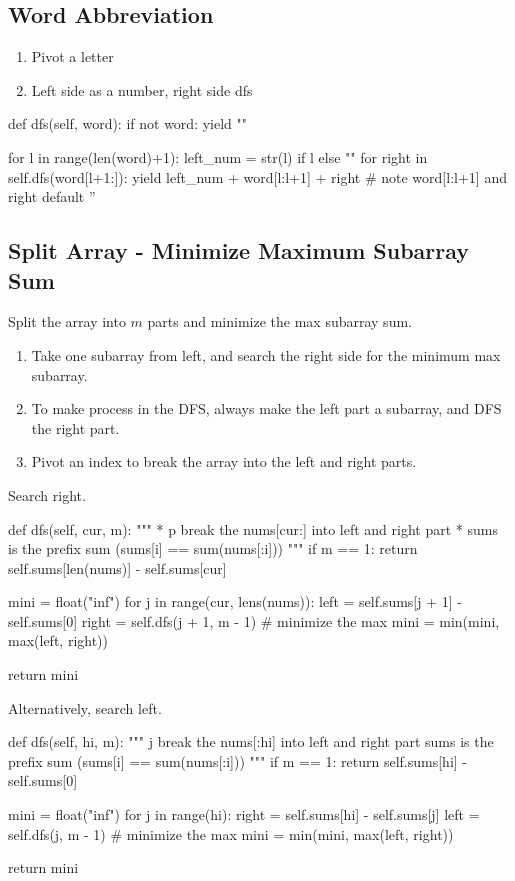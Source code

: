 \subsection{Word Abbreviation}
\begin{enumerate}
\item Pivot a letter
\item Left side as a number, right side dfs 
\end{enumerate}

\begin{python}
def dfs(self, word):
    if not word:
        yield ""

    for l in range(len(word)+1):
        left_num = str(l) if l else ""
        for right in self.dfs(word[l+1:]):
            yield left_num + word[l:l+1] + right
            # note word[l:l+1] and right default ''
\end{python}

\subsection{Split Array - Minimize Maximum Subarray Sum}
Split the array into $m$ parts and minimize the max subarray sum.
\begin{enumerate}
\item Take one subarray from left, and search the right side for the minimum max subarray. 
\item To make process in the DFS, always make the left part a subarray, and DFS the right part. 
\item Pivot an index to break the array into the left and right parts.
\end{enumerate}

Search right.
\begin{python}
def dfs(self, cur, m):
    """
    * p break the nums[cur:] into left and right part
    * sums is the prefix sum (sums[i] == sum(nums[:i]))
    """
    if m == 1:
        return self.sums[len(nums)] - self.sums[cur]

    mini = float("inf")
    for j in range(cur, lens(nums)):
        left = self.sums[j + 1] - self.sums[0]
        right = self.dfs(j + 1, m - 1)
        # minimize the max
        mini = min(mini, max(left, right))

    return mini
\end{python}

Alternatively, search left. 
\begin{python}
def dfs(self, hi, m):
    """
    j break the nums[:hi] into left and right part
    sums is the prefix sum (sums[i] == sum(nums[:i]))
    """
    if m == 1:
        return self.sums[hi] - self.sums[0]

    mini = float("inf")
    for j in range(hi):
        right = self.sums[hi] - self.sums[j]
        left = self.dfs(j, m - 1)
        # minimize the max
        mini = min(mini, max(left, right))

    return mini
\end{python}


